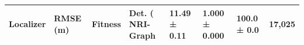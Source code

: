 \begin{tabular}{lllll}
\toprule
Localizer & RMSE (m) & Fitness & Det. (%
\midrule
NRI-Graph & 11.49 ± 0.11 & 1.000 ± 0.000 & 100.0 ± 0.0 & 17,025 \\
\bottomrule
\end{tabular}
